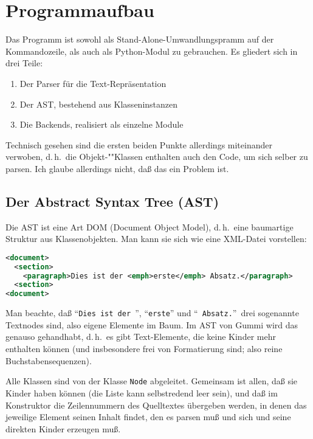 \documentclass[12pt,openany]{book}
\begin{document}
\section{Programmaufbau}

Das Programm ist sowohl als Stand-Alone-Umwandlungspramm auf der Kommandozeile,
als auch als Python-Modul zu gebrauchen.   Es gliedert sich in drei Teile:

\begin{enumerate}
\item Der Parser für die Text-Repräsentation
\item Der AST, bestehend aus Klasseninstanzen
\item Die Backends, realisiert als einzelne Module
\end{enumerate}

Technisch gesehen sind die ersten beiden Punkte allerdings miteinander
verwoben, d.\,h.\ die Ob\-jekt-""Klas\-sen enthalten auch den Code, um sich selber zu
parsen.  Ich glaube allerdings nicht, daß das ein Problem ist.

\subsection{Der Abstract Syntax Tree (AST)}

Die AST ist eine Art DOM (Document Object Model), d.\,h.\ eine baumartige
Struktur aus Klassenobjekten.  Man kann sie sich wie eine XML-Datei vorstellen:

\begin{lstlisting}[language=XML]
<document>
  <section>
    <paragraph>Dies ist der <emph>erste</emph> Absatz.</paragraph>
  <section>
<document>
\end{lstlisting}

Man beachte, daß "`\texttt{Dies ist der~}"', "`\texttt{erste}"' und
"`~\texttt{Absatz.}"'\ drei sogenannte Textnodes sind, also eigene Elemente im
Baum.  Im AST von Gummi wird das genauso gehandhabt, d.\,h.\ es gibt
Text-Elemente, die keine Kinder mehr enthalten können (und insbesondere frei
von Formatierung sind; also reine Buchstabensequenzen).

Alle Klassen sind von der Klasse \lstinline{Node} abgeleitet.  Gemeinsam ist
allen, daß sie Kinder haben können (die Liste kann selbstredend leer sein), und
daß im Konstruktor die Zeilennummern des Quelltextes übergeben werden, in denen
das jeweilige Element seinen Inhalt findet, den es parsen muß und sich und
seine direkten Kinder erzeugen muß.
\end{document}
